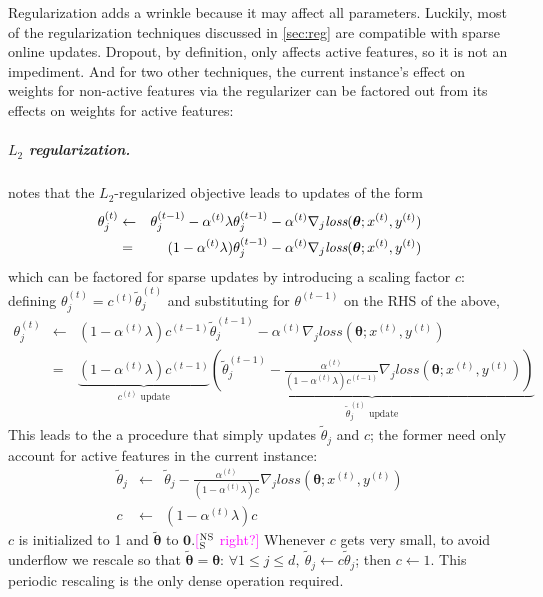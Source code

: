 \documentclass[11pt,letterpaper]{article}
\newcommand{\ensuretext}[1]{#1}
\newcommand{\nssmarker}{\ensuretext{\textcolor{magenta}{\ensuremath{^{\textsc{NS}}_{\textsc{S}}}}}}
\newcommand{\arkcomment}[3]{\ensuretext{\textcolor{#3}{[#1 #2]}}}
\newcommand{\nss}[1]{\arkcomment{\nssmarker}{#1}{magenta}}
\begin{document}
Regularization adds a wrinkle because it may affect all parameters.
Luckily, most of the regularization techniques discussed in \cref{sec:reg} are compatible with sparse online updates.
Dropout, by definition, only affects active features, so it is not an impediment. 
And for two other techniques, the current instance's effect on weights for non-active features via the regularizer  
can be factored out from its effects on weights for active features:

\subparagraph{$L_2$ regularization.}
 notes that the $L_2$-regularized objective leads to updates of the form
\begin{eqnarray*}
\theta^{(t)}_j & \leftarrow & \theta^{(t-1)}_j - \alpha^{(t)}\lambda\theta^{(t-1)}_j - \alpha^{(t)}\nabla_j\textit{loss}(\boldsymbol{\theta}; x^{(t)}, y^{(t)}) \\
						& = & \hspace{1.25em}(1 - \alpha^{(t)}\lambda)\theta^{(t-1)}_j - \alpha^{(t)}\nabla_j\textit{loss}(\boldsymbol{\theta}; x^{(t)}, y^{(t)})
\end{eqnarray*}
which can be factored for sparse updates by introducing a scaling factor $c$: 
defining $\theta^{(t)}_j = c^{(t)}\tilde{\theta}^{(t)}_j$ and substituting for $\theta^{(t-1)}$ on the RHS of the above,
\begin{eqnarray*}
\theta^{(t)}_j & \leftarrow & 
                  (1 - \alpha^{(t)}\lambda)c^{(t-1)}\tilde{\theta}^{(t-1)}_j - \alpha^{(t)}\nabla_j\textit{loss}(\boldsymbol{\theta}; x^{(t)}, y^{(t)}) \\
& = & \underbrace{(1 - \alpha^{(t)}\lambda)c^{(t-1)}}_{c^{(t)}\textrm{ update}}\underbrace{\left(\tilde{\theta}^{(t-1)}_j - \frac{\alpha^{(t)}}{(1 - \alpha^{(t)}\lambda)c^{(t-1)}}\nabla_j\textit{loss}(\boldsymbol{\theta}; x^{(t)}, y^{(t)})\right)}_{\tilde{\theta}^{(t)}_j\textrm{ update}}
\end{eqnarray*}
This leads to the a procedure that simply updates $\tilde{\theta}_j$ and $c$; 
the former need only account for active features in the current instance: 
\begin{eqnarray}
\tilde{\theta}_j & \leftarrow & \tilde{\theta}_j - \frac{\alpha^{(t)}}{(1 - \alpha^{(t)}\lambda)c}\nabla_j\textit{loss}(\boldsymbol{\theta}; x^{(t)}, y^{(t)}) \\
c & \leftarrow & (1 - \alpha^{(t)}\lambda)c
\end{eqnarray}
$c$ is initialized to 1 and $\tilde{\boldsymbol{\theta}}$ to $\mathbf{0}$.\nss{right?} 
Whenever $c$ gets very small, to avoid underflow we rescale so that $\tilde{\boldsymbol{\theta}}=\boldsymbol{\theta}$: 
$\forall 1\leq j\leq d,~ \tilde{\theta}_j \leftarrow c\tilde{\theta}_j$; then $c \leftarrow 1$. 
This periodic rescaling is the only dense operation required.
\end{document}
